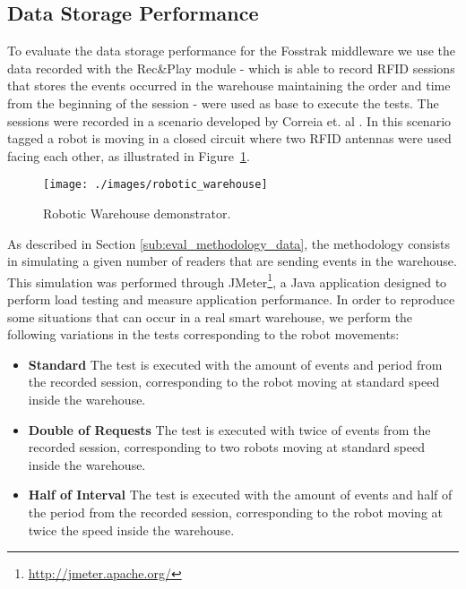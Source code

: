 \subsection{Data Storage Performance}
\label{sub:eval_exp_data}
To evaluate the data storage performance for the Fosstrak middleware we use the data recorded with the Rec\&Play
module - which is able to record \gls{RFID} sessions that stores the events occurred in the warehouse
maintaining the order and time from the beginning of the session - were used as base to execute
the tests. The sessions were recorded in a scenario developed by Correia et. al \cite{Correia:Thesis:2014}.
In this scenario tagged a robot is moving in a closed circuit where two \gls{RFID} antennas were used
facing each other, as illustrated in Figure~\ref{fig:robotic_warehouse}.\\

\begin{figure}[ht!]
  \centering
  \texttt{[image: ./images/robotic\_warehouse]}
  \caption[Robotic Warehouse demonstrator.]{Robotic Warehouse demonstrator.}
  \label{fig:robotic_warehouse}
\end{figure}

As described in Section \ref{sub:eval_methodology_data}, the methodology consists in simulating a given
number of readers that are sending events in the warehouse. This simulation was performed through
JMeter\footnote{\url{http://jmeter.apache.org/}}, a Java application designed to perform load testing
and measure application performance. In order to reproduce some situations that can occur in a real
smart warehouse, we perform the following variations in the tests corresponding to the robot movements:

\begin{itemize}
  \item\textbf{Standard} The test is executed with the amount of events and period from the recorded
  session, corresponding to the robot moving at standard speed inside the warehouse.
  \item\textbf{Double of Requests} The test is executed with twice of events from the recorded session,
  corresponding to two robots moving at standard speed inside the warehouse.
  \item\textbf{Half of Interval} The test is executed with the amount of events and half of the period from
  the recorded session, corresponding to the robot moving at twice the speed inside the warehouse.
\end{itemize}

